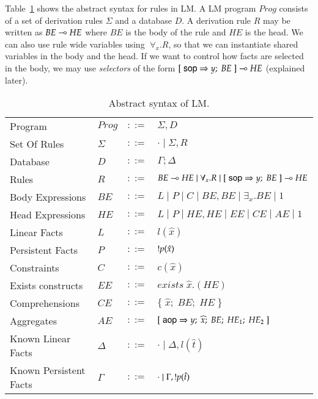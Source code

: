 
\newcommand{\selector}[0]{[\; \m{sop} \Rightarrow y; \; BE \;] \lolli HE}
\newcommand{\comprehension}[0]{\{ \; \widehat{x}; \; BE; \; HE \; \}}
\newcommand{\aggregate}[0]{[\;\m{aop} \Rightarrow y; \; \widehat{x}; \; BE; \; HE_1; \; HE_2 \;]}

Table~\ref{tbl:ast} shows the abstract syntax for rules in LM.
A LM program $Prog$ consists of a set of derivation rules $\Sigma$ and a database $D$.
A derivation rule $R$ may be written as $BE \multimap HE$ where $BE$ is the body of the rule and
$HE$ is the head. We can also use rule wide variables using $\; \forall_{x}. R$, so that we can instantiate
shared variables in the body and the head.
If we want to control how facts are selected in the body, we may use \emph{selectors} of
the form $\selector$ (explained later).

\begin{table}[h]
\centering
\begin{tabular}{ l l c l }
  Program & $Prog$ & $::=$ & $\Sigma, D$ \\
  Set Of Rules & $\Sigma$ & $::=$ & $\cdot \; | \; \Sigma, R$\\
  Database & $D$ & $::=$ & $\Gamma; \Delta$ \\
  Rules & $R$ & $::=$ & $BE \lolli HE \; | \; \forall_{x}. R \; | \; \selector$ \\
  Body Expressions & $BE$ & $::=$ & $L \; | \; P \; | \; C \; | \; BE, BE \; | \; \exists_{x}. BE \; | \; 1$\\
  Head Expressions & $HE$ & $::=$ & $L \; | \; P \; | \; HE, HE \; | \; EE \; | \; CE \; | \; AE \; | \; 1$\\
  
  Linear Facts & $L$ & $::=$ & $l(\hat{x})$\\
  Persistent Facts & $P$ & $::=$ & ${!} p(\hat{x})$\\
  Constraints & $C$ & $::=$ & $c(\hat{x})$ \\
  
  Exists constructs & $EE$ & $::=$ & $exists \; \widehat{x}. (HE)$ \\
  Comprehensions & $CE$ & $::=$ & $\comprehension$ \\
  Aggregates & $AE$ & $::=$ & $\aggregate$ \\
  
  Known Linear Facts & $\Delta$ & $::=$ & $\cdot \; | \; \Delta, l(\hat{t})$ \\
  Known Persistent Facts & $\Gamma$ & $::=$ & $\cdot \; | \; \Gamma, {!} p(\hat{t})$ \\
\end{tabular}
\caption{Abstract syntax of LM.}\label{tbl:ast}
\end{table}

